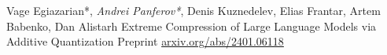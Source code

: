 
\begin{cventries}
  \cventry
    {Vage Egiazarian*, \textit{Andrei Panferov*}, Denis Kuznedelev, Elias Frantar, Artem Babenko, Dan Alistarh} %
    {Extreme Compression of Large Language Models via Additive Quantization} %
    {Preprint} %
    {\href{https://arxiv.org/abs/2401.06118}{\url{arxiv.org/abs/2401.06118}}} %
    {}


    
\end{cventries}
